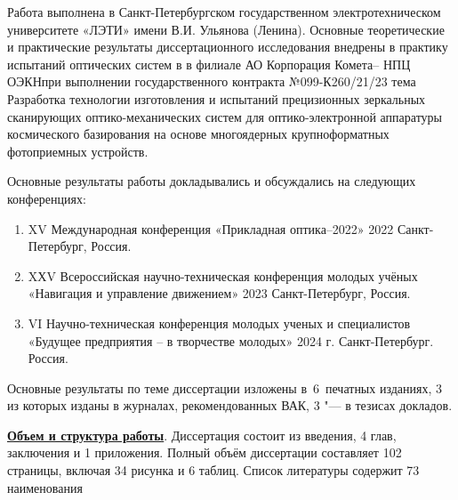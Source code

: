 {\realisation} 
Работа выполнена в Санкт-Петербургском государственном электротехническом университете «ЛЭТИ» имени В.И. Ульянова (Ленина). Основные теоретические и практические результаты диссертационного исследования внедрены в практику испытаний оптических систем в в филиале АО \flqq Корпорация \glqq Комета\grqq -- \glqq НПЦ ОЭКН\grqq \frqq при выполнении государственного контракта №099-К260/21/23 тема \flqq Разработка технологии изготовления и испытаний прецизионных зеркальных сканирующих оптико-механических систем для оптико-электронной аппаратуры космического базирования на основе многоядерных крупноформатных фотоприемных устройств\frqq.


{\probation}
Основные результаты работы докладывались и обсуждались на следующих конференциях:
\begin{enumerate}
	\item XV Международная конференция «Прикладная оптика–2022» 2022 Санкт-Петербург, Россия.
	\item XХV Всероссийская научно-техническая конференция молодых учёных «Навигация и управление движением» 2023 Санкт-Петербург, Россия.
	\item VI Научно-техническая конференция молодых ученых и специалистов «Будущее предприятия – в творчестве молодых» 2024 г. Санкт-Петербург. Россия.
\end{enumerate}

{\publications} Основные результаты по теме диссертации изложены
в~6~печатных изданиях,
3 из которых изданы в журналах, рекомендованных ВАК,
3 "--- в тезисах докладов.

\underline{\textbf{Объем и структура работы}}. Диссертация состоит из введения, 4 глав,
заключения и 1 приложения. Полный объём диссертации составляет 102 страницы, включая 34 рисунка и 6 таблиц. Список литературы содержит 73 наименования

